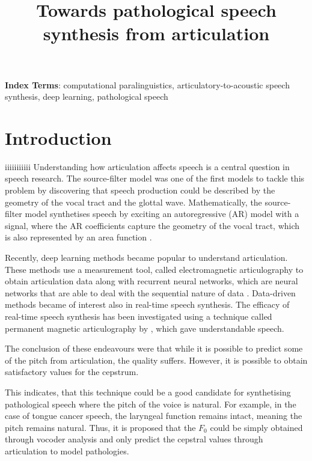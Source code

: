 \documentclass[a4paper]{article}
\title{Towards pathological speech synthesis from articulation}
\begin{document}
\maketitle
% 
\begin{abstract}
  \blindtext[1]
\end{abstract}
\noindent\textbf{Index Terms}: computational paralinguistics, articulatory-to-acoustic
speech synthesis, deep learning, pathological speech

\section{Introduction}
iiiiiiiiiii
Understanding how articulation affects speech is a central question in speech
research. The source-filter model was one of the first models to tackle this
problem by discovering that speech production could be described by
the geometry of the vocal tract and the glottal wave. Mathematically,
the source-filter model synthetises speech by exciting an autoregressive (AR) model with a
signal, where the AR coefficients capture the geometry of the
vocal tract, which is also represented by an area function \cite{Benesty2009}. 

Recently, deep learning methods became popular
to understand articulation. These methods use a measurement tool,
called electromagnetic articulography to obtain articulation data 
\cite{Aryal2016} \cite{Taguchi} \cite{Liu2018} along with recurrent
neural networks, which are neural networks that are able to deal with
the sequential nature of data \cite{Hochreiter1997}. Data-driven methods became of interest also
in real-time speech synthesis. The efficacy of real-time speech synthesis
has been investigated using a technique called permanent magnetic articulography
by \cite{Gonzalez2017}, which gave understandable
speech.

The conclusion of these endeavours were that while it is possible to
predict some of the pitch from articulation, the quality suffers.
However, it is possible to obtain satisfactory values for the
cepstrum.

This indicates, that this technique could be a good candidate for synthetising
pathological speech where the pitch of the voice is natural. For example,
in the case of tongue cancer speech, the laryngeal function remains intact,
meaning the pitch remains natural. Thus, it is proposed that the \( F_0 \) could
be simply obtained through vocoder analysis and only predict the cepstral
values through articulation to model pathologies.
\end{document}

